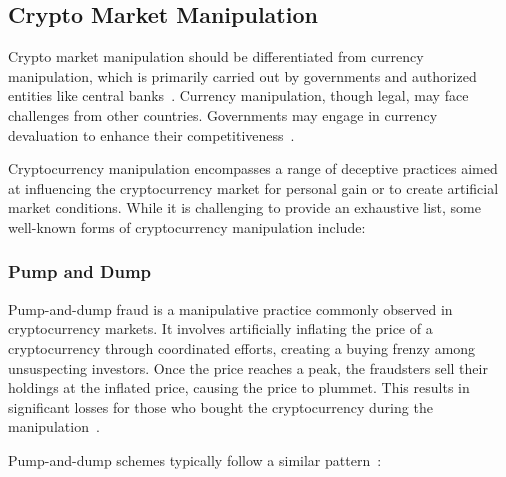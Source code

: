 \subsection{Crypto Market Manipulation}
Crypto market manipulation should be differentiated from currency manipulation, which is primarily carried out by
governments and authorized entities like central banks~\cite{goldstein2018currency}. Currency manipulation, though
legal, may face challenges from other countries. Governments may engage in currency devaluation to enhance their
competitiveness~\cite{goldstein2018currency}.

Cryptocurrency manipulation encompasses a range of deceptive practices aimed at influencing the cryptocurrency market
for personal gain or to create artificial market conditions. While it is challenging to provide an exhaustive list, some
well-known forms of cryptocurrency manipulation include:

\subsubsection{Pump and Dump}
Pump-and-dump fraud is a manipulative practice commonly observed in cryptocurrency markets. It involves artificially
inflating the price of a cryptocurrency through coordinated efforts, creating a buying frenzy among unsuspecting
investors. Once the price reaches a peak, the fraudsters sell their holdings at the inflated price, causing the price to
plummet. This results in significant losses for those who bought the cryptocurrency during the
manipulation~\cite{karim2018manipulation}.

Pump-and-dump schemes typically follow a similar pattern~\cite{cheah2015pump}:

